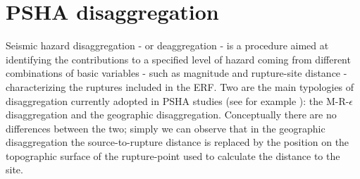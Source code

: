 %
\clearpage\newpage
\section{PSHA disaggregation}
\label{chap:disaggregation}
%
Seismic hazard disaggregation - or deaggregation - \citep{mcguire1995,bazzurro1999} is a procedure aimed at identifying the contributions to a specified level of hazard coming from different combinations
of basic variables - such as magnitude and rupture-site distance - characterizing the ruptures included in the ERF.
%
Two are the main typologies of disaggregation currently adopted in PSHA studies (see for example \citet{petersen2008}): the M-R-$\epsilon$ disaggregation and the geographic disaggregation. Conceptually there are no differences between the two; simply we can observe that in the geographic disaggregation the source-to-rupture distance is replaced by the position on the topographic surface of the rupture-point used to calculate the distance to the site.
%

